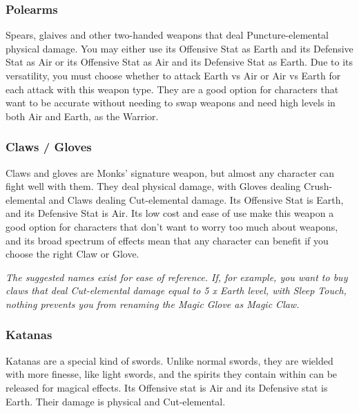\subsubsection{Polearms}

Spears, glaives and other two-handed weapons that deal Puncture-elemental physical damage. You may either use its Offensive Stat as Earth and its Defensive Stat as Air or its Offensive Stat as Air and its Defensive Stat as Earth. Due to its versatility, you must choose whether to attack Earth vs Air or Air vs Earth for each attack with this weapon type. They are a good option for characters that want to be accurate without needing to swap weapons and need high levels in both Air and Earth, as the Warrior. 

\begin{tabwpn}[label=inv-pole,range=melee,type=physical,element=puncture,roll=earthvair / airvearth]
    
\end{tabwpn}
\clearpage

\subsubsection{Claws / Gloves}

Claws and gloves are Monks’ signature weapon, but almost any character can fight well with them. They deal physical damage, with Gloves dealing Crush-elemental and Claws dealing Cut-elemental damage. Its Offensive Stat is Earth, and its Defensive Stat is Air. Its low cost and ease of use make this weapon a good option for characters that don’t want to worry too much about weapons, and its broad spectrum of effects mean that any character can benefit if you choose the right Claw or Glove. 

\begin{tabwpn}[label=inv-claws,range=melee,type=physical,element=crush / cut,roll=earthvair]
    
\end{tabwpn}
{\footnotesize\textit{The suggested names exist for ease of reference. If, for example, you want to buy claws that deal Cut-elemental damage equal to 5 x Earth level, with Sleep Touch, nothing prevents you from renaming the Magic Glove as Magic Claw.}}
\clearpage

\subsubsection{Katanas}

Katanas are a special kind of swords. Unlike normal swords, they are wielded with more finesse, like light swords, and the spirits they contain within can be released for magical effects. Its Offensive stat is Air and its Defensive stat is Earth. Their damage is physical and Cut-elemental.

